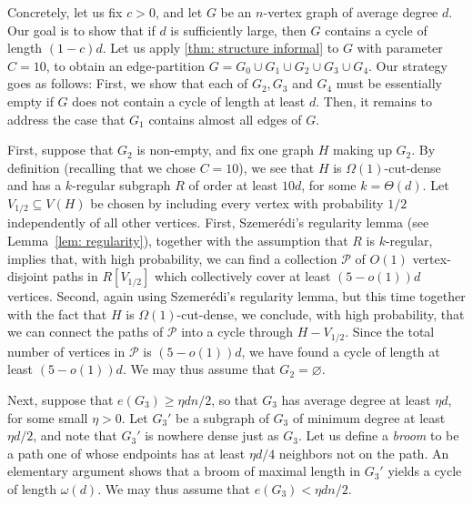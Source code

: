 \documentclass[10pt]{article}
\theoremstyle{definition}
\let\geq\geqslant
\begin{document}
Concretely, let us fix $c>0$, and let $G$ be an $n$-vertex graph of average degree $d$. Our goal is to show that if $d$ is sufficiently large, then $G$ contains a cycle of length $(1-c)d$. Let us apply \cref{thm: structure informal} to $G$ with parameter $C=10$, to obtain an edge-partition $G=G_0 \cup G_1 \cup G_2 \cup G_3 \cup G_4$. Our strategy goes as follows: First, we show that each of $G_2,G_3$ and $G_4$ must be essentially empty if $G$ does not contain a cycle of length at least $d$. Then, it remains to address the case that $G_1$ contains almost all edges of $G$.

First, suppose that $G_2$ is non-empty, and fix one graph $H$ making up $G_2$. By definition (recalling that we chose $C=10$), we see that $H$ is $\Omega(1)$-cut-dense and has a $k$-regular subgraph $R$ of order at least $10d$, for some $k=\Theta(d)$. Let $V_{1/2}\subseteq V(H)$ be chosen by including every vertex with probability $1/2$ independently of all other vertices. First, Szemer\'edi's regularity lemma (see Lemma~\ref{lem: regularity}), together with the assumption that $R$ is $k$-regular, implies that, with high probability, we can find a collection $\mathcal P$ of $O(1)$ vertex-disjoint paths in $R[V_{1/2}]$ which collectively cover at least $(5-o(1))d$ vertices. Second, again using Szemer\'edi's regularity lemma, but this time together with the fact that $H$ is $\Omega(1)$-cut-dense, we conclude, with high probability, that we can connect the paths of $\mathcal P$ into a cycle through $H-V_{1/2}$. Since the total number of vertices in $\mathcal P$ is $(5-o(1))d$, we have found a cycle of length at least $(5-o(1))d$. We may thus assume that $G_2=\varnothing$.

Next, suppose that $e(G_3)\geq \eta dn/2$, so that $G_3$ has average degree at least $\eta d$, for some small $\eta>0$. Let $G_3'$ be a subgraph of $G_3$ of minimum degree at least $\eta d/2$, and note that $G_3'$ is nowhere dense just as $G_3$. Let us define a \emph{broom} to be a path one of whose endpoints has at least $\eta d/4$ neighbors not on the path. An elementary argument shows that a broom of maximal length in $G_3'$ yields a cycle of length $\omega(d)$. We may thus assume that $e(G_3)< \eta dn/2$.
\end{document}
